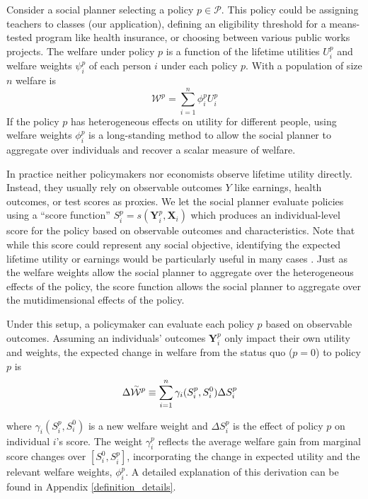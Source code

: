\documentclass[12pt]{article}
\theoremstyle{definition}
\theoremstyle{definition}
\theoremstyle{definition}
\theoremstyle{definition}
\begin{document}
Consider a social planner selecting a policy $p\in \mathcal{P}$. This policy could be assigning teachers to classes (our application), defining an eligibility threshold for a means-tested program like health insurance, or choosing between various public works projects. The welfare under policy $p$ is a function of the lifetime utilities $U^p_i$ and welfare weights $\psi^p_i$ of each person $i$ under each policy $p$. With a population of size $n$ welfare is
        \begin{equation*}
        \mathcal{W}^p =  \sum_{i=1}^n \phi^p_i U^p_i
        \end{equation*}
\noindent If the policy $p$ has heterogeneous effects on utility for different people, using welfare weights $\phi^p_i$ is a long-standing method to allow the social planner to aggregate over individuals and recover a scalar measure of welfare.
    
In practice neither policymakers nor economists observe lifetime utility directly. Instead, they usually rely on observable outcomes $Y$ like earnings, health outcomes, or test scores as proxies. We let the social planner evaluate policies using a ``score function''  $S^p_i=s(\bm{Y}^p_i,\bm{X}_i)$ which produces an individual-level score for the policy based on observable outcomes and characteristics. Note that while this score could represent any social objective, identifying the expected lifetime utility or earnings would be particularly useful in many cases \citep[see the related work on surrogate indeces][]{athey2019surrogate}. Just as the welfare weights allow the social planner to aggregate over the heterogeneous effects of the policy, the score function allows the social planner to aggregate over the mutidimensional effects of the policy.


Under this setup, a policymaker can evaluate each policy $p$ based on observable outcomes. 
Assuming an individuals' outcomes $\bm{Y}_i^p$ only impact their own utility and weights, the expected change in welfare from the status quo ($p=0$) to policy $p$ is 
\begin{align}\label{def_welfare_change}
       \Delta \accentset{\sim}{\mathcal{W}}^p& \equiv \sum_{i=1}^n \gamma_i(S_i^p, S_i^0) \Delta S^p_i 
\end{align}

\noindent where $\gamma_i(S_i^p, S_i^0)$ is a new welfare weight and $\Delta S^p_i$ is the effect of policy $p$ on individual $i$'s score. The weight $\gamma_i^p$ reflects the average welfare gain from marginal score changes over $[S_i^0,S_i^p]$, incorporating the change in expected utility and the relevant welfare weights, $\phi^p_i$. A detailed explanation of this derivation can be found in Appendix \ref{definition_details}.
\end{document}
